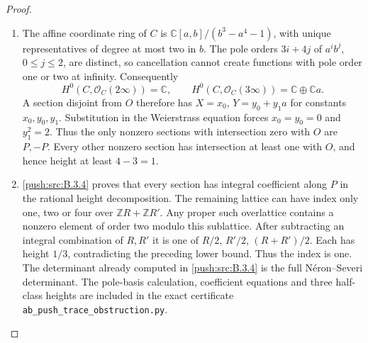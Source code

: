\begin{proof}
\begin{enumerate}[label=\arabic*.,leftmargin=*]
\item The affine coordinate ring of $C$ is
$\mathbb C[a,b]/(b^3-a^4-1)$, with
unique representatives of degree at most
two in $b$. The pole orders $3i+4j$ of
$a^ib^j$, $0\le j\le2$, are distinct,
so cancellation cannot create functions
with pole order one or two at infinity.
Consequently
\[
 H^0(C,\mathcal O_C(2\infty))=\mathbb C,
 \qquad
 H^0(C,\mathcal O_C(3\infty))
       =\mathbb C\oplus\mathbb Ca.
\]
A section disjoint from $O$ therefore
has $X=x_0$, $Y=y_0+y_1a$ for constants
$x_0,y_0,y_1$. Substitution in the
Weierstrass equation forces $x_0=y_0=0$
and $y_1^2=2$. Thus the only nonzero
sections with intersection zero with
$O$ are $P,-P$.
Every other nonzero section has
intersection at least one with $O$,
and hence height at least $4-3=1$.

\item \ref{push:src:B.3.4} proves that every section has
integral coefficient along $P$ in the
rational height decomposition. The
remaining lattice can have index only
one, two or four over $\mathbb ZR+\mathbb ZR'$.
Any proper such overlattice contains a
nonzero element of order two modulo
this sublattice. After subtracting an
integral combination of $R,R'$ it is
one of $R/2$, $R'/2$, $(R+R')/2$.
Each has height $1/3$, contradicting
the preceding lower bound. Thus the
index is one. The determinant already
computed in \ref{push:src:B.3.4} is the full
N\'eron--Severi determinant.
The pole-basis calculation, coefficient
equations and three half-class heights
are included in the exact certificate
\texttt{ab\_push\_trace\_obstruction.py}.
\end{enumerate}
\end{proof}

